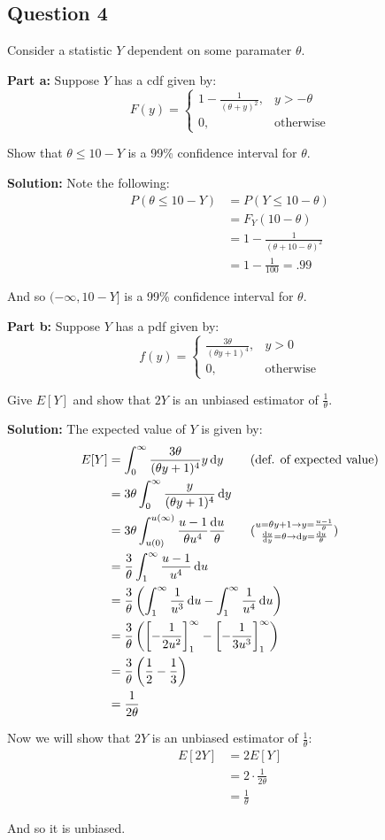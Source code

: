 \documentclass{article}
\renewcommand{\eval}[3]{\left[#1\right]_{#2}^{#3}}
\begin{document}
\subsection*{Question 4}
Consider a statistic $Y$ dependent on some paramater $\theta$.
\bigskip

\noindent\textbf{Part a:} Suppose $Y$ has a cdf given by:
$$F(y)=\begin{cases}
    1-\frac{1}{(\theta+y)^2},&y>-\theta\\
    0,&\text{otherwise}
\end{cases}$$

Show that $\theta\le10-Y$ is a 99\% confidence interval for $\theta$.
\bigskip

\noindent\textbf{Solution:} Note the following:
\begin{align*}
    P(\theta\le10-Y)&=P(Y\le10-\theta)\\
    &=F_Y(10-\theta)\tag{def. of cdf}\\
    &=1-\frac{1}{(\theta+10-\theta)^2}\tag{$10-\theta>-\theta$}\\
    &=1-\frac{1}{100}=.99
\end{align*}

And so $(-\infty,10-Y]$ is a 99\% confidence interval for $\theta$.
\bigskip

\noindent\textbf{Part b:} Suppose $Y$ has a pdf given by:
$$f(y)=\begin{cases}
    \frac{3\theta}{(\theta y+1)^4},&y>0\\
    0,&\text{otherwise}
\end{cases}$$

Give $E[Y]$ and show that $2Y$ is an unbiased estimator of $\frac{1}{\theta}$. 
\bigskip

\noindent\textbf{Solution:} The expected value of $Y$ is given by:
\begin{align*}
    E[Y]&=\int_0^\infty\frac{3\theta}{(\theta y+1)^4}y\dd{y}\tag{def. of expected value}\\
    &=3\theta\int_0^\infty\frac{y}{(\theta y+1)^4}\dd{y}\\
    &=3\theta\int_{u(0)}^{u(\infty)}\frac{u-1}{\theta u^4}\frac{\dd{u}}{\theta}\tag{$\substack{u=\theta y+1\rightarrow y=\frac{u-1}{\theta}\\\dv{u}{y}=\theta\rightarrow\dd y=\frac{\dd u}{\theta}}$}\\
    &=\frac{3}{\theta}\int_1^\infty\frac{u-1}{u^4}\dd{u}\\
    &=\frac{3}{\theta}\left(\int_1^\infty\frac{1}{u^3}\dd{u}-\int_1^\infty\frac{1}{u^4}\dd{u}\right)\\
    &=\frac{3}{\theta}\left(\eval{-\frac{1}{2u^2}}{1}{\infty}-\eval{-\frac{1}{3u^3}}{1}{\infty}\right)\\
    &=\frac{3}{\theta}\left(\frac{1}{2}-\frac{1}{3}\right)\\
    &=\frac{1}{2\theta}
\end{align*}

Now we will show that $2Y$ is an unbiased estimator of $\frac{1}{\theta}$:
\begin{align*}
    E[2Y]&=2E[Y]\tag{linearity of expectation}\\
    &=2\cdot\frac{1}{2\theta}\tag{see above}\\
    &=\frac{1}{\theta}
\end{align*}

And so it is unbiased.
\end{document}
